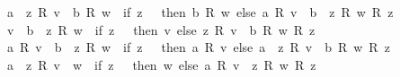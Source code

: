 \begin{isabellebody}
\ \ {\isachardoublequoteopen}{\isacharparenleft}{\kern0pt}a\ {\isacharslash}{\kern0pt}\ z{\isacharparenright}{\kern0pt}\ {\isacharasterisk}{\kern0pt}\isactrlsub R\ v\ {\isacharplus}{\kern0pt}\ b\ {\isacharasterisk}{\kern0pt}\isactrlsub R\ w\ {\isacharequal}{\kern0pt}\ {\isacharparenleft}{\kern0pt}if\ z\ {\isacharequal}{\kern0pt}\ {}\ then\ b\ {\isacharasterisk}{\kern0pt}\isactrlsub R\ w\ else\ {\isacharparenleft}{\kern0pt}a\ {\isacharasterisk}{\kern0pt}\isactrlsub R\ v\ {\isacharplus}{\kern0pt}\ {\isacharparenleft}{\kern0pt}b\ {\isacharasterisk}{\kern0pt}\ z{\isacharparenright}{\kern0pt}\ {\isacharasterisk}{\kern0pt}\isactrlsub R\ w{\isacharparenright}{\kern0pt}\ {\isacharslash}{\kern0pt}\isactrlsub R\ z{\isacharparenright}{\kern0pt}{\isachardoublequoteclose}\isanewline
\ \ {\isachardoublequoteopen}v\ {\isacharminus}{\kern0pt}\ {\isacharparenleft}{\kern0pt}b\ {\isacharslash}{\kern0pt}\ z{\isacharparenright}{\kern0pt}\ {\isacharasterisk}{\kern0pt}\isactrlsub R\ w\ {\isacharequal}{\kern0pt}\ {\isacharparenleft}{\kern0pt}if\ z\ {\isacharequal}{\kern0pt}\ {}\ then\ v\ else\ {\isacharparenleft}{\kern0pt}z\ {\isacharasterisk}{\kern0pt}\isactrlsub R\ v\ {\isacharminus}{\kern0pt}\ b\ {\isacharasterisk}{\kern0pt}\isactrlsub R\ w{\isacharparenright}{\kern0pt}\ {\isacharslash}{\kern0pt}\isactrlsub R\ z{\isacharparenright}{\kern0pt}{\isachardoublequoteclose}\isanewline
\ \ {\isachardoublequoteopen}a\ {\isacharasterisk}{\kern0pt}\isactrlsub R\ v\ {\isacharminus}{\kern0pt}\ {\isacharparenleft}{\kern0pt}b\ {\isacharslash}{\kern0pt}\ z{\isacharparenright}{\kern0pt}\ {\isacharasterisk}{\kern0pt}\isactrlsub R\ w\ {\isacharequal}{\kern0pt}\ {\isacharparenleft}{\kern0pt}if\ z\ {\isacharequal}{\kern0pt}\ {}\ then\ a\ {\isacharasterisk}{\kern0pt}\isactrlsub R\ v\ else\ {\isacharparenleft}{\kern0pt}{\isacharparenleft}{\kern0pt}a\ {\isacharasterisk}{\kern0pt}\ z{\isacharparenright}{\kern0pt}\ {\isacharasterisk}{\kern0pt}\isactrlsub R\ v\ {\isacharminus}{\kern0pt}\ b\ {\isacharasterisk}{\kern0pt}\isactrlsub R\ w{\isacharparenright}{\kern0pt}\ {\isacharslash}{\kern0pt}\isactrlsub R\ z{\isacharparenright}{\kern0pt}{\isachardoublequoteclose}\isanewline
\ \ {\isachardoublequoteopen}{\isacharparenleft}{\kern0pt}a\ {\isacharslash}{\kern0pt}\ z{\isacharparenright}{\kern0pt}\ {\isacharasterisk}{\kern0pt}\isactrlsub R\ v\ {\isacharminus}{\kern0pt}\ w\ {\isacharequal}{\kern0pt}\ {\isacharparenleft}{\kern0pt}if\ z\ {\isacharequal}{\kern0pt}\ {}\ then\ {\isacharminus}{\kern0pt}w\ else\ {\isacharparenleft}{\kern0pt}a\ {\isacharasterisk}{\kern0pt}\isactrlsub R\ v\ {\isacharminus}{\kern0pt}\ z\ {\isacharasterisk}{\kern0pt}\isactrlsub R\ w{\isacharparenright}{\kern0pt}\ {\isacharslash}{\kern0pt}\isactrlsub R\ z{\isacharparenright}{\kern0pt}{\isachardoublequoteclose}\isanewline

\end{isabellebody}
